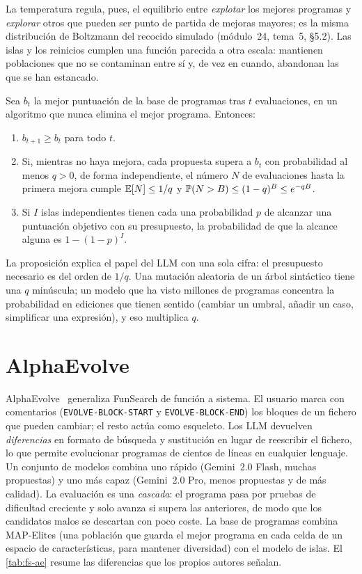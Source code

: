 La temperatura regula, pues, el equilibrio entre \emph{explotar} los mejores programas y \emph{explorar} otros que pueden ser punto de partida de mejoras mayores; es la misma distribución de Boltzmann del recocido simulado (módulo~24, tema~5, §5.2). Las islas y los reinicios cumplen una función parecida a otra escala: mantienen poblaciones que no se contaminan entre sí y, de vez en cuando, abandonan las que se han estancado.

\begin{proposicion}\label{prop:espera}
Sea $b_t$ la mejor puntuación de la base de programas tras $t$ evaluaciones, en un algoritmo que nunca elimina el mejor programa. Entonces:
\begin{enumerate}
  \item $b_{t+1}\ge b_t$ para todo $t$.
  \item Si, mientras no haya mejora, cada propuesta supera a $b_t$ con probabilidad al menos $q>0$, de forma independiente, el número $N$ de evaluaciones hasta la primera mejora cumple $\mathbb{E}[N]\le 1/q$ y $\mathbb{P}(N>B)\le(1-q)^{B}\le e^{-qB}$.
  \item Si $I$ islas independientes tienen cada una probabilidad $p$ de alcanzar una puntuación objetivo con su presupuesto, la probabilidad de que la alcance alguna es $1-(1-p)^{I}$.
\end{enumerate}
\end{proposicion}

La proposición explica el papel del LLM con una sola cifra: el presupuesto necesario es del orden de $1/q$. Una mutación aleatoria de un árbol sintáctico tiene una $q$ minúscula; un modelo que ha visto millones de programas concentra la probabilidad en ediciones que tienen sentido (cambiar un umbral, añadir un caso, simplificar una expresión), y eso multiplica $q$.

\section{AlphaEvolve}

AlphaEvolve~\cite{alphaevolve} generaliza FunSearch de función a sistema. El usuario marca con comentarios (\texttt{EVOLVE-BLOCK-START} y \texttt{EVOLVE-BLOCK-END}) los bloques de un fichero que pueden cambiar; el resto actúa como esqueleto. Los LLM devuelven \emph{diferencias} en formato de búsqueda y sustitución en lugar de reescribir el fichero, lo que permite evolucionar programas de cientos de líneas en cualquier lenguaje. Un conjunto de modelos combina uno rápido (Gemini~2.0 Flash, muchas propuestas) y uno más capaz (Gemini~2.0 Pro, menos propuestas y de más calidad). La evaluación es una \emph{cascada}: el programa pasa por pruebas de dificultad creciente y solo avanza si supera las anteriores, de modo que los candidatos malos se descartan con poco coste. La base de programas combina MAP-Elites (una población que guarda el mejor programa en cada celda de un espacio de características, para mantener diversidad) con el modelo de islas. El \cref{tab:fs-ae} resume las diferencias que los propios autores señalan.

